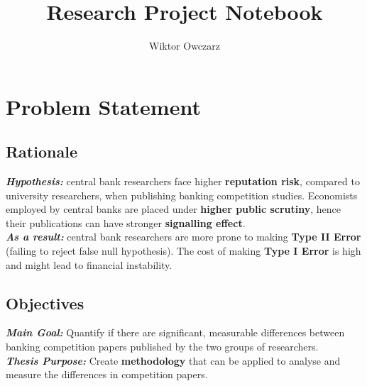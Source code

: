 \documentclass{article}
\title{\vspace{-2.5cm} \textbf{Research Project Notebook}}
\author{Wiktor Owczarz}
\begin{document}
\maketitle

\section{Problem Statement}

\subsection*{Rationale}

\textbf{\textit{Hypothesis:}} central bank researchers face higher \textbf{reputation risk}, compared to university researchers, when publishing banking competition studies. Economists employed by central banks are placed
under \textbf{higher public scrutiny}, hence their publications can have stronger \textbf{signalling effect}.\\

\textbf{\textit{As a result:}} central bank researchers are more prone to making \textbf{Type II Error} (failing to reject false null hypothesis). The cost of making \textbf{Type I Error} is high and might lead to financial instability.\\



\subsection*{Objectives}
\textbf{\textit{Main Goal:}} Quantify if there are significant, measurable differences between banking competition papers published by the two groups of researchers. \\

\textbf{\textit{Thesis Purpose:}} Create \textbf{methodology} that can be applied to analyse and measure the differences in  competition papers.\\
\end{document}
